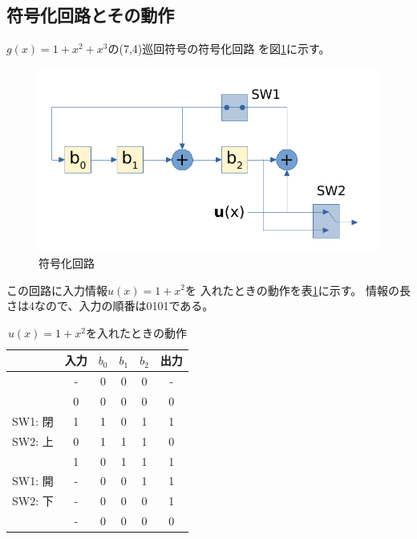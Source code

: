 \documentclass[a4paper,11pt]{jsarticle}
\begin{document}
\subsection{符号化回路とその動作}
$g(x)=1+x^2+x^3$の(7,4)巡回符号の符号化回路
を図\ref{fig:encoding-circuit}に示す。
\begin{figure}[htbp]
  \begin{center}
  \includegraphics[scale=1.0]{figures/cyclic7-4-encoding.pdf}
  \end{center}
  \caption{符号化回路
  \label{fig:encoding-circuit}
  }
\end{figure}
この回路に入力情報$u(x)=1+x^2$を
入れたときの動作を表\ref{table:circuit-behavior}に示す。
情報の長さは4なので、入力の順番は0101である。
\begin{table}[hbtp]
  \caption{$u(x)=1+x^2$を入れたときの動作}
  \label{table:circuit-behavior}
  \centering
  \begin{tabular}{cc|ccc|c}
    & 入力 & $b_0$ & $b_1$ & $b_2$ & 出力 \\ \hline
    & - & 0 & 0 & 0 & - \\
    & 0 & 0 & 0 & 0 & 0 \\
    SW1: 閉 & 1 & 1 & 0 & 1 & 1 \\
    SW2: 上 & 0 & 1 & 1 & 1 & 0 \\
    & 1 & 0 & 1 & 1 & 1 \\ \hline
    SW1: 開 & - & 0 & 0 & 1 & 1 \\
    SW2: 下 & - & 0 & 0 & 0 & 1 \\
    & - & 0 & 0 & 0 & 0
  \end{tabular}
\end{table}
\end{document}
